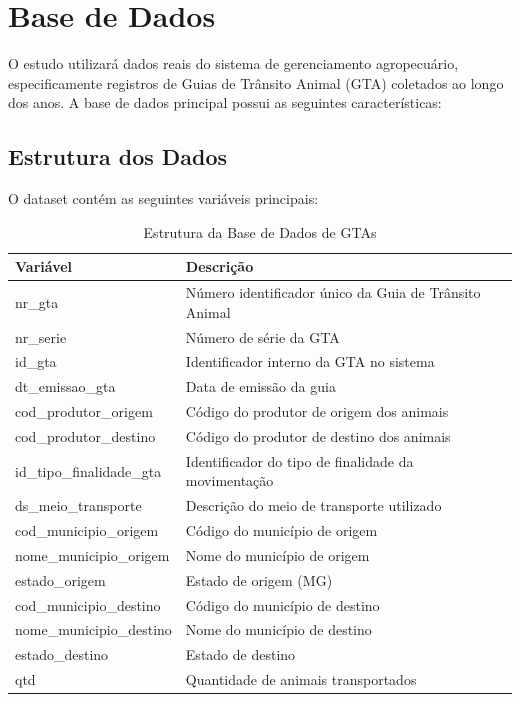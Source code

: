 \section{Base de Dados}

O estudo utilizará dados reais do sistema de gerenciamento agropecuário, especificamente registros de Guias de Trânsito Animal (GTA) coletados ao longo dos anos. A base de dados principal possui as seguintes características:

\subsection{Estrutura dos Dados}
O dataset contém as seguintes variáveis principais:

\begin{table}[h]
\centering
\caption{Estrutura da Base de Dados de GTAs}
\begin{tabular}{|l|p{8cm}|}
\hline
\textbf{Variável} & \textbf{Descrição} \\
\hline
nr\_gta & Número identificador único da Guia de Trânsito Animal \\
\hline
nr\_serie & Número de série da GTA \\
\hline
id\_gta & Identificador interno da GTA no sistema \\
\hline
dt\_emissao\_gta & Data de emissão da guia \\
\hline
cod\_produtor\_origem & Código do produtor de origem dos animais \\
\hline
cod\_produtor\_destino & Código do produtor de destino dos animais \\
\hline
id\_tipo\_finalidade\_gta & Identificador do tipo de finalidade da movimentação \\
\hline
ds\_meio\_transporte & Descrição do meio de transporte utilizado \\
\hline
cod\_municipio\_origem & Código do município de origem \\
\hline
nome\_municipio\_origem & Nome do município de origem \\
\hline
estado\_origem & Estado de origem (MG) \\
\hline
cod\_municipio\_destino & Código do município de destino \\
\hline
nome\_municipio\_destino & Nome do município de destino \\
\hline
estado\_destino & Estado de destino \\
\hline
qtd & Quantidade de animais transportados \\
\hline
\end{tabular}
\end{table}

